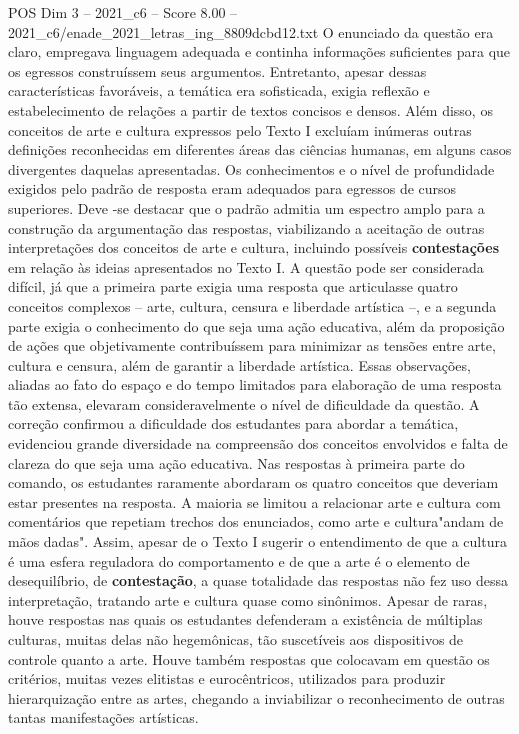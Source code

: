 \begin{textsample}{POS Dim 3 – 2021\_c6 – Score 8.00 – 2021\_c6/enade\_2021\_letras\_ing\_8809dcbd12.txt}
O enunciado da questão era claro, empregava linguagem adequada e continha informações suficientes para que os egressos construíssem seus argumentos.
Entretanto, apesar dessas características favoráveis, a temática era sofisticada, exigia reflexão e estabelecimento de relações a partir de textos concisos e densos.
Além disso, os conceitos de arte e cultura expressos pelo Texto I excluíam inúmeras outras definições reconhecidas em diferentes áreas das ciências humanas, em alguns casos divergentes daquelas apresentadas.
Os conhecimentos e o nível de profundidade exigidos pelo padrão de resposta eram adequados para egressos de cursos superiores.
Deve -se destacar que o padrão admitia um espectro amplo para a construção da argumentação das respostas, viabilizando a aceitação de outras interpretações dos conceitos de arte e cultura, incluindo possíveis \textbf{contestações} em relação às ideias apresentados no Texto I.
A questão pode ser considerada difícil, já que a primeira parte exigia uma resposta que articulasse quatro conceitos complexos – arte, cultura, censura e liberdade artística –, e a segunda parte exigia o conhecimento do que seja uma ação educativa, além da proposição de ações que objetivamente contribuíssem para minimizar as tensões entre arte, cultura e censura, além de garantir a liberdade artística.
Essas observações, aliadas ao fato do espaço e do tempo limitados para elaboração de uma resposta tão extensa, elevaram consideravelmente o nível de dificuldade da questão.
A correção confirmou a dificuldade dos estudantes para abordar a temática, evidenciou grande diversidade na compreensão dos conceitos envolvidos e falta de clareza do que seja uma ação educativa.
Nas respostas à primeira parte do comando, os estudantes raramente abordaram os quatro conceitos que deveriam estar presentes na resposta.
A maioria se limitou a relacionar arte e cultura com comentários que repetiam trechos dos enunciados, como arte e cultura"andam de mãos dadas".
Assim, apesar de o Texto I sugerir o entendimento de que a cultura é uma esfera reguladora do comportamento e de que a arte é o elemento de desequilíbrio, de \textbf{contestação}, a quase totalidade das respostas não fez uso dessa interpretação, tratando arte e cultura quase como sinônimos.
Apesar de raras, houve respostas nas quais os estudantes defenderam a existência de múltiplas culturas, muitas delas não hegemônicas, tão suscetíveis aos dispositivos de controle quanto a arte.
Houve também respostas que colocavam em questão os critérios, muitas vezes elitistas e eurocêntricos, utilizados para produzir hierarquização entre as artes, chegando a inviabilizar o reconhecimento de outras tantas manifestações artísticas.

\end{textsample}
